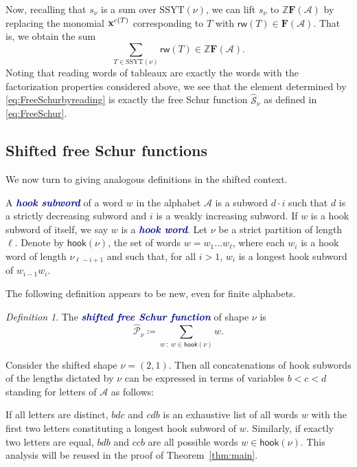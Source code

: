 \documentclass[12 pt]{amsart}
\newcommand{\newword}[1]{\textcolor{darkblue}{\textbf{\emph{#1}}}}
\newcommand{\Z}{\mathbb{Z}}
\newcommand{\Free}{\mathbf{F}}
\newcommand{\FreeSchur}{\widehat{\mathcal{S}}}
\newcommand{\sFreeSchur}{\widehat{\mathcal{P}}}
\newcommand{\reading}{\mathsf{rw}}
\newcommand{\cA}{\mathcal{A}}
\newcommand{\SSYT}{\mathrm{SSYT}}
\newcommand{\hookword}{\mathsf{hook}}
\theoremstyle{remark}
\newtheorem{definition}[thm]{Definition}
\newenvironment{example}
  {\pushQED{\qed}\renewcommand{\qedsymbol}{$\diamondsuit$}\examplex}
  {\popQED\endexamplex}
\numberwithin{equation}{section}
\begin{document}
Now, recalling that $s_\nu$ is a sum over $\SSYT(\nu)$, we can lift $s_\nu$ to $\Z\Free(\cA)$ by replacing the monomial ${\bf x}^{c(T)}$ corresponding to $T$ with $\reading(T) \in \Free(\cA)$. That is, we obtain the sum
\begin{equation}\label{eq:FreeSchurbyreading}
    \sum_{ T\in \SSYT(\nu)   }   \reading(T) \in \Z\Free(\cA).
\end{equation}
Noting that reading words of tableaux are exactly the words with the factorization properties considered above, we see that the element determined by \eqref{eq:FreeSchurbyreading} is exactly the free Schur function $\FreeSchur_\nu$ as defined in \eqref{eq:FreeSchur}.

\subsection{Shifted free Schur functions}
We now turn to giving analogous definitions in the shifted context.

    A \newword{hook subword} of a word $w$ in the alphabet $\cA$ is a subword $d\cdot i$ such that $d$ is a strictly decreasing subword and $i$ is a weakly increasing subword. If $w$ is a hook subword of itself, we say $w$ is a \newword{hook word}.
    Let $\nu$ be a strict partition of length $\ell$. Denote by $\hookword(\nu)$, the set of  words $w=w_1\ldots w_\ell$, where each $w_i$ is a hook word of length $\nu_{\ell-i+1}$ and such that, for all $i>1$, $w_i$ is a longest hook subword of $w_{i-1}w_i$. 

    
   The following definition appears to be new, even for finite alphabets.
\begin{definition}\label{def:shifted_free}
        The \newword{shifted free Schur function} of shape $\nu$ is
\[\sFreeSchur_\nu \coloneqq \sum_{ w\: : \:  w\in \hookword(\nu)}   w.\]
\end{definition}  

\begin{example}\label{ex:21}
    Consider the shifted shape $\nu=(2,1)$. Then all concatenations of hook subwords of the lengths dictated by $\nu$ can be expressed in terms of variables $b<c<d$ standing for letters of $\cA$ as follows:

    If all letters are distinct, $bdc$ and $cdb$ is an exhaustive list of all words $w$ with the first two letters constituting a longest hook subword of $w$. Similarly, if exactly two letters are equal, $bdb$ and $ccb$ are all possible words $w\in \hookword(\nu)$. This analysis will be reused in the proof of Theorem~\ref{thm:main}.
\end{example}
\end{document}
